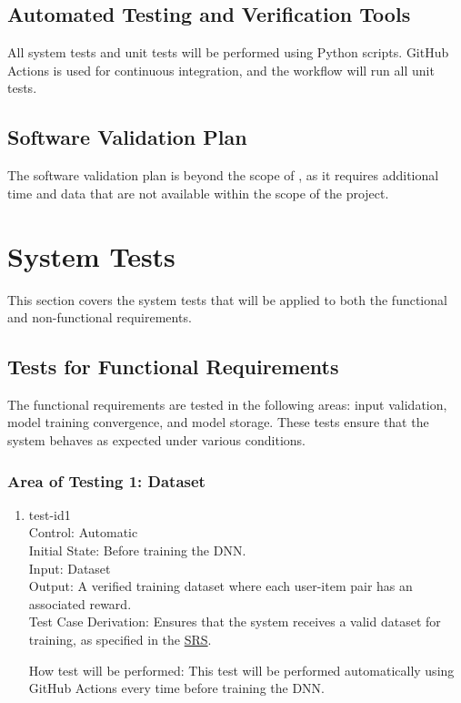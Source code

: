 \documentclass[12pt, titlepage]{article}
\begin{document}
\subsection{Automated Testing and Verification Tools}
All system tests and unit tests will be performed using Python scripts.  
GitHub Actions is used for continuous integration, and the workflow will run all unit tests.
\subsection{Software Validation Plan}

The software validation plan is beyond the scope of \progname, as it requires additional time and data that are not available within the scope of the project.

\section{System Tests}\label{SystemTest}

This section covers the system tests that will be applied to both the functional and non-functional requirements.

\subsection{Tests for Functional Requirements}

The functional requirements are tested in the following areas: input validation, model training convergence, and model storage. These tests ensure that the system behaves as expected under various conditions.

\subsubsection{Area of Testing 1: Dataset}

\begin{enumerate}

  \item{test-id1\\}
  Control: Automatic\\
  Initial State: Before training the DNN.\\
  Input: Dataset\\
  Output: A verified training dataset where each user-item pair has an associated reward.\\
  Test Case Derivation: Ensures that the system receives a valid dataset for training, as specified in the \href{https://github.com/V-AS/Two-tower-recommender-system/blob/main/docs/SRS/SRS.pdf}{SRS}.

  How test will be performed: This test will be performed automatically using GitHub Actions every time before training the DNN.
					
\end{enumerate}
\end{document}
